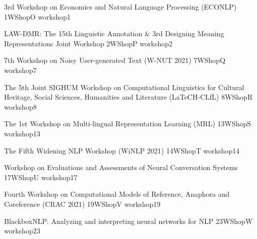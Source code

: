 

\begin{wsschedule}
  {3rd Workshop on Economics and Natural Language Processing (ECONLP)}
  {1}{WShopO}
  {workshop1}
  {\WShopLocI}
  
\end{wsschedule}

\begin{wsschedule}
  {LAW-DMR: The 15th Linguistic Annotation & 3rd Designing Meaning Representations Joint Workshop}
  {2}{WShopP}
  {workshop2}
  {\WShopLocJ}
  
\end{wsschedule}

\begin{wsschedule}
  {7th Workshop on Noisy User-generated Text (W-NUT 2021)}
  {7}{WShopQ}
  {workshop7}
  {\WShopLocK}
  
\end{wsschedule}

\begin{wsschedule}
  {The 5th Joint SIGHUM Workshop on Computational Linguistics for Cultural Heritage, Social Sciences, Humanities and Literature (LaTeCH-CLfL)}
  {8}{WShopR}
  {workshop8}
  {\WShopLocL}
  
\end{wsschedule}

\begin{wsschedule}
  {The 1st Workshop on Multi-lingual Representation Learning (MRL)}
  {13}{WShopS}
  {workshop13}
  {\WShopLocM}
  
\end{wsschedule}

\begin{wsschedule}
  {The Fifth Widening NLP Workshop (WiNLP 2021)}
  {14}{WShopT}
  {workshop14}
  {\WShopLocN}
  
\end{wsschedule}

\begin{wsschedule}
  {Workshop on Evaluations and Assessments of Neural Conversation Systems}
  {17}{WShopU}
  {workshop17}
  {\WShopLocN}
  
\end{wsschedule}

\begin{wsschedule}
  {Fourth Workshop on Computational Models of Reference, Anaphora and Coreference (CRAC 2021)}
  {19}{WShopV}
  {workshop19}
  {\WShopLocN}
  
\end{wsschedule}

\begin{wsschedule}
  {BlackboxNLP: Analyzing and interpreting neural networks for NLP}
  {23}{WShopW}
  {workshop23}
  {\WShopLocN}
  
\end{wsschedule}


\clearpage{\thispagestyle{emptyheader}\cleardoublepage}
